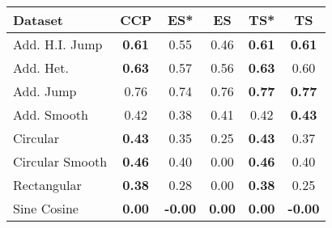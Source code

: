 \begin{tabular}{lccccc}
\toprule
Dataset & CCP & ES* & ES & TS* & TS \\
\midrule
Add. H.I. Jump & \textbf{0.61} & 0.55 & 0.46 & \textbf{0.61} & \textbf{0.61} \\
Add. Het. & \textbf{0.63} & 0.57 & 0.56 & \textbf{0.63} & 0.60 \\
Add. Jump & 0.76 & 0.74 & 0.76 & \textbf{0.77} & \textbf{0.77} \\
Add. Smooth & 0.42 & 0.38 & 0.41 & 0.42 & \textbf{0.43} \\
Circular & \textbf{0.43} & 0.35 & 0.25 & \textbf{0.43} & 0.37 \\
Circular Smooth & \textbf{0.46} & 0.40 & 0.00 & \textbf{0.46} & 0.40 \\
Rectangular & \textbf{0.38} & 0.28 & 0.00 & \textbf{0.38} & 0.25 \\
Sine Cosine & \textbf{0.00} & \textbf{-0.00} & \textbf{0.00} & \textbf{0.00} & \textbf{-0.00} \\
\bottomrule
\end{tabular}